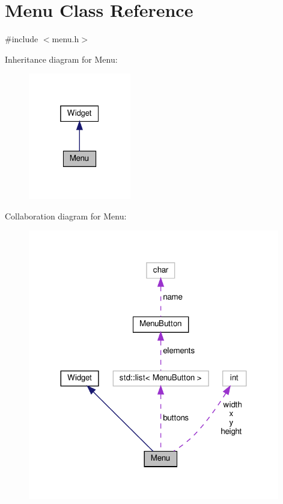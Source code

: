 \hypertarget{class_menu}{}\section{Menu Class Reference}
\label{class_menu}


{\ttfamily \#include $<$menu.\+h$>$}



Inheritance diagram for Menu\+:
\nopagebreak
\begin{figure}[H]
\begin{center}
\leavevmode
\includegraphics[width=127pt]{class_menu__inherit__graph}
\end{center}
\end{figure}


Collaboration diagram for Menu\+:
\nopagebreak
\begin{figure}[H]
\begin{center}
\leavevmode
\includegraphics[width=311pt]{class_menu__coll__graph}
\end{center}
\end{figure}
